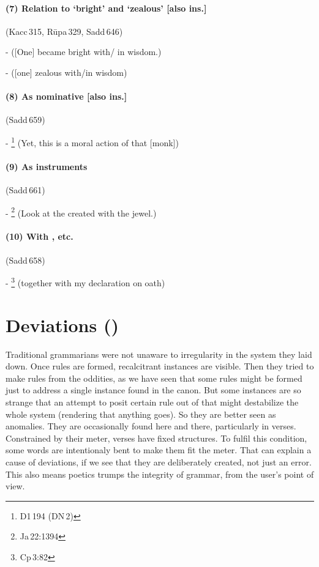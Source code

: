 \paragraph*{(7) Relation to `bright' and `zealous' [also ins.]} (Kacc\,315, R\=upa\,329, Sadd\,646)\par
-  ([One] became bright with/ in wisdom.)\par
-  ([one] zealous with/in wisdom)\par

\paragraph*{(8) As nominative [also ins.]} (Sadd\,659)\par
- \footnote{D1\,194 (DN\,2)} (Yet, this is a moral action of that [monk])\par

\paragraph*{(9) As instruments} (Sadd\,661)\par
- \footnote{Ja\,22:1394} (Look at the created with the jewel.)\par

\paragraph*{(10) With , etc.} (Sadd\,658)\par
- \footnote{Cp\,3:82} (together with my declaration on oath)\par

{}
\section*{Deviations ()}

Traditional grammarians were not unaware to irregularity in the system they laid down. Once rules are formed, recalcitrant instances are visible. Then they tried to make rules from the oddities, as we have seen that some rules might be formed just to address a single instance found in the canon. But some instances are so strange that an attempt to posit certain rule out of that might destabilize the whole system (rendering that anything goes). So they are better seen as anomalies. They are occasionally found here and there, particularly in verses. Constrained by their meter, verses have fixed structures. To fulfil this condition, some words are intentionaly bent to make them fit the meter. That can explain a cause of deviations, if we see that they are deliberately created, not just an error. This also means poetics trumps the integrity of grammar, from the user's point of view.

